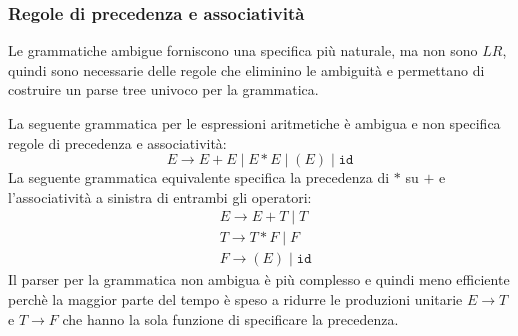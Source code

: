 \documentclass[a4paper]{article}
\begin{document}
\subsubsection{Regole di precedenza e associatività}
Le grammatiche ambigue forniscono una specifica più naturale, ma non sono \( LR \),
quindi sono necessarie delle regole che eliminino le ambiguità e permettano di
costruire un parse tree univoco per la grammatica.
\begin{example}
  La seguente grammatica per le espressioni aritmetiche è ambigua e non specifica
  regole di precedenza e associatività:
  \[
    E \to E + E \mid E * E \mid (E) \mid \texttt{id}
  \] 
  La seguente grammatica equivalente specifica la precedenza di \( * \) su \( + \) e
  l'associatività a sinistra di entrambi gli operatori:
  \[
    \begin{aligned}
      &E \to E + T \mid T \\
      &T \to T * F \mid F \\
      &F \to (E) \mid \texttt{id}
    \end{aligned}
  \] 
  Il parser per la grammatica non ambigua è più complesso e quindi meno efficiente
  perchè la maggior parte del tempo è speso a ridurre le produzioni unitarie
  \( E \to T \) e \( T \to F \) che hanno la sola funzione di specificare la precedenza.
\end{example}
\end{document}
